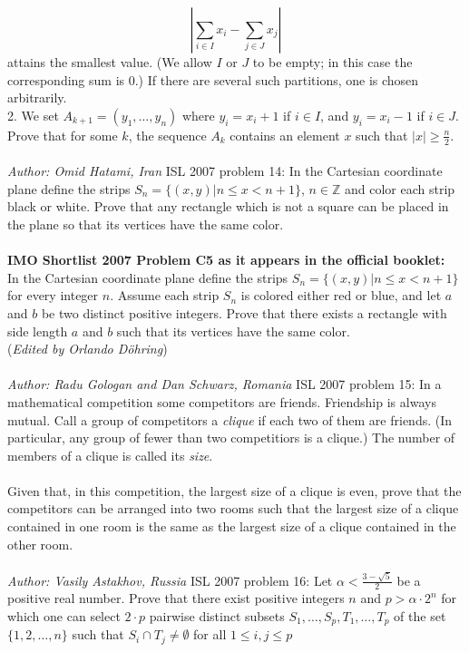 \[ \left|\sum_{i\in I}x_i - \sum_{j\in J}x_j\right| \]
attains the smallest value. (We allow $ I$ or $ J$ to be empty; in this case the corresponding sum is 0.) If there are several such partitions, one is chosen arbitrarily. \\
2. We set $ A_{k + 1} = (y_1,\dots,y_n)$ where $ y_i = x_i + 1$ if $ i\in I$, and $ y_i = x_i - 1$ if $ i\in J$. \\
Prove that for some $ k$, the sequence $ A_k$ contains an element $ x$ such that $ |x|\geq\frac n2$. \\\\
\textit{Author: Omid Hatami, Iran} 
ISL 2007 problem 14:  In the Cartesian coordinate plane define the strips $ S_n = \{(x,y)|n\le x < n + 1\}$, $ n\in\mathbb{Z}$ and color each strip black or white. Prove that any rectangle which is not a square can be placed in the plane so that its vertices have the same color. \\\\
\textbf{IMO Shortlist 2007 Problem C5 as it appears in the official booklet:} \\
In the Cartesian coordinate plane define the strips $ S_n = \{(x,y)|n\le x < n + 1\}$ for every integer $ n.$ Assume each strip $ S_n$ is colored either red or blue, and let $ a$ and $ b$ be two distinct positive integers. Prove that there exists a rectangle with side length $ a$ and $ b$ such that its vertices have the same color. \\
(\textit{Edited by Orlando Döhring}) \\\\
\textit{Author: Radu Gologan and Dan Schwarz, Romania} 
ISL 2007 problem 15:  In a mathematical competition some competitors are friends. Friendship is always mutual. Call a group of competitors a \textit{clique} if each two of them are friends. (In particular, any group of fewer than two competitiors is a clique.) The number of members of a clique is called its \textit{size}. \\\\
Given that, in this competition, the largest size of a clique is even, prove that the competitors can be arranged into two rooms such that the largest size of a clique contained in one room is the same as the largest size of a clique contained in the other room. \\\\
\textit{Author: Vasily Astakhov, Russia} 
ISL 2007 problem 16:  Let $ \alpha < \frac {3 - \sqrt {5}}{2}$ be a positive real number. Prove that there exist positive integers $ n$ and $ p > \alpha \cdot 2^n$ for which one can select $ 2 \cdot p$ pairwise distinct subsets $ S_1, \ldots, S_p, T_1, \ldots, T_p$ of the set $ \{1,2, \ldots, n\}$ such that $ S_i \cap T_j \neq \emptyset$ for all $ 1 \leq i,j \leq p$ \\\\
